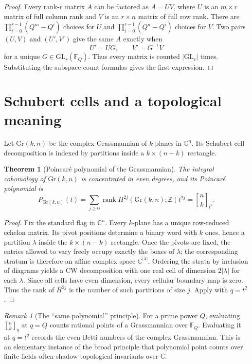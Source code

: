 \documentclass[11pt,oneside,openany]{book}
\newtheorem{theorem}{Theorem}[chapter]
\theoremstyle{definition}
\theoremstyle{remark}
\newtheorem{remark}[remark]{Remark}
\newcommand{\qbinom}[2]{\genfrac{[}{]}{0pt}{}{#1}{#2}_{q}}
\newcommand{\Qbinom}[3]{\genfrac{[}{]}{0pt}{}{#1}{#2}_{#3}}
\newcommand{\C}{\mathbb C}
\newcommand{\Z}{\mathbb Z}
\newcommand{\F}{\mathbb F}
\newcommand{\abs}[1]{\lvert #1\rvert}
\begin{document}
\begin{proof}
Every rank-$r$ matrix $A$ can be factored as $A=UV$, where $U$ is an $m\times r$ matrix of full column rank and $V$ is an $r\times n$ matrix of full row rank.  There are
\(
 \prod_{i=0}^{r-1}(Q^m-Q^i)
\)
choices for $U$ and
\(
 \prod_{i=0}^{r-1}(Q^n-Q^i)
\)
choices for $V$.  Two pairs $(U,V)$ and $(U',V')$ give the same $A$ exactly when
\[
 U'=UG,\qquad V'=G^{-1}V
\]
for a unique $G\in\mathrm{GL}_r(\F_Q)$.  Thus every matrix is counted $\abs{\mathrm{GL}_r}$ times.  Substituting the subspace-count formulas gives the first expression.
\end{proof}

\section{Schubert cells and a topological meaning}

Let $\mathrm{Gr}(k,n)$ be the complex Grassmannian of $k$-planes in $\C^n$.  Its Schubert cell decomposition is indexed by partitions inside a $k\times(n-k)$ rectangle.

\begin{theorem}[Poincar\'e polynomial of the Grassmannian]\label{thm:grassmann-poincare}
The integral cohomology of $\mathrm{Gr}(k,n)$ is concentrated in even degrees, and its Poincar\'e polynomial is
\[
 P_{\mathrm{Gr}(k,n)}(t)
 =\sum_{j\ge0}\operatorname{rank}H^{2j}(\mathrm{Gr}(k,n);\Z)t^{2j}
 =\Qbinom nk{t^2}.
\]
\end{theorem}

\begin{proof}
Fix the standard flag in $\C^n$.  Every $k$-plane has a unique row-reduced echelon matrix.  Its pivot positions determine a binary word with $k$ ones, hence a partition $\lambda$ inside the $k\times(n-k)$ rectangle.  Once the pivots are fixed, the entries allowed to vary freely occupy exactly the boxes of $\lambda$; the corresponding stratum is therefore an affine complex space $\C^{\abs\lambda}$.  Ordering the strata by inclusion of diagrams yields a CW decomposition with one real cell of dimension $2\abs\lambda$ for each $\lambda$.  Since all cells have even dimension, every cellular boundary map is zero.  Thus the rank of $H^{2j}$ is the number of such partitions of size $j$.  Apply  with $q=t^2$.
\end{proof}

\begin{remark}[The ``same polynomial'' principle]
For a prime power $Q$, evaluating $\qbinom nk$ at $q=Q$ counts rational points of a Grassmannian over $\F_Q$.  Evaluating it at $q=t^2$ records the even Betti numbers of the complex Grassmannian.  This is an elementary instance of the broad principle that polynomial point counts over finite fields often shadow topological invariants over $\C$.
\end{remark}
\end{document}
